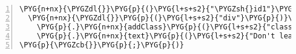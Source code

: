 \begin{Verbatim}[commandchars=\\\{\},numbers=left,stepnumber=1,codes={\catcode`\$=3\catcode`\^=7\catcode`\_=8}]
\PYG{n+nx}{\PYGZdl{}}\PYG{p}{(}\PYG{l+s+s2}{"\PYGZsh{}id1"}\PYG{p}{)}\PYG{p}{.}\PYG{n+nx}{onClick}\PYG{p}{(}\PYG{k+kd}{function}\PYG{p}{(}\PYG{n+nx}{evt}\PYG{p}{)}\PYG{p}{\PYGZob{}}
  \PYG{n+nx}{\PYGZdl{}}\PYG{p}{(}\PYG{l+s+s2}{"div"}\PYG{p}{)}\PYG{p}{.}\PYG{n+nx}{first}\PYG{p}{(}\PYG{p}{)}
    \PYG{p}{.}\PYG{n+nx}{addClass}\PYG{p}{(}\PYG{l+s+s2}{"class2"}\PYG{p}{)}
    \PYG{p}{.}\PYG{n+nx}{text}\PYG{p}{(}\PYG{l+s+s2}{"Don't leave yet!"}\PYG{p}{)}\PYG{p}{;}
\PYG{p}{\PYGZcb{}}\PYG{p}{;}\PYG{p}{)}
\end{Verbatim}
